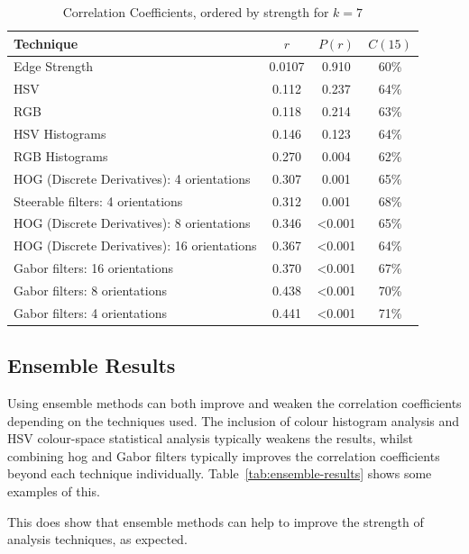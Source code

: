 \begin{table}[h]
\centering
\begin{tabular}{|l|c|c|c|}\hline
Technique     					& $r$    & $P(r)$ & $C(15)$ \\ \hline
Edge Strength 					& 0.0107 & 0.910  & 60\%    \\
HSV 						& 0.112	 & 0.237  & 64\%    \\
RGB 						& 0.118  & 0.214  & 63\%    \\
HSV Histograms					& 0.146	 & 0.123  & 64\%    \\
RGB Histograms					& 0.270	 & 0.004  & 62\%    \\
HOG (Discrete Derivatives): 4 orientations 	& 0.307	 & 0.001  & 65\%    \\
Steerable filters: 4 orientations 		& 0.312	 & 0.001  & 68\%    \\
HOG (Discrete Derivatives): 8 orientations 	& 0.346	 & \textless0.001 & 65\% \\
HOG (Discrete Derivatives): 16 orientations 	& 0.367	 & \textless0.001 & 64\% \\
Gabor filters: 16 orientations			& 0.370  & \textless0.001 & 67\% \\
Gabor filters: 8 orientations			& 0.438	 & \textless0.001 & 70\% \\
Gabor filters: 4 orientations			& 0.441	 & \textless0.001 & 71\% \\
\hline
\end{tabular}
\caption{Correlation Coefficients, ordered by strength for $k=7$}\label{tab:r-results}
\end{table}


\newpage
\subsection{Ensemble Results}
Using ensemble methods can both improve and weaken the correlation coefficients depending on the
techniques used. The inclusion of colour histogram analysis and HSV colour-space statistical
analysis typically weakens the results, whilst combining \gls{hog} and Gabor filters typically 
improves the correlation coefficients beyond each technique individually. 
Table~\ref{tab:ensemble-results} shows some examples of this.

This does show that ensemble methods can help to improve the strength of analysis techniques, as
expected.

